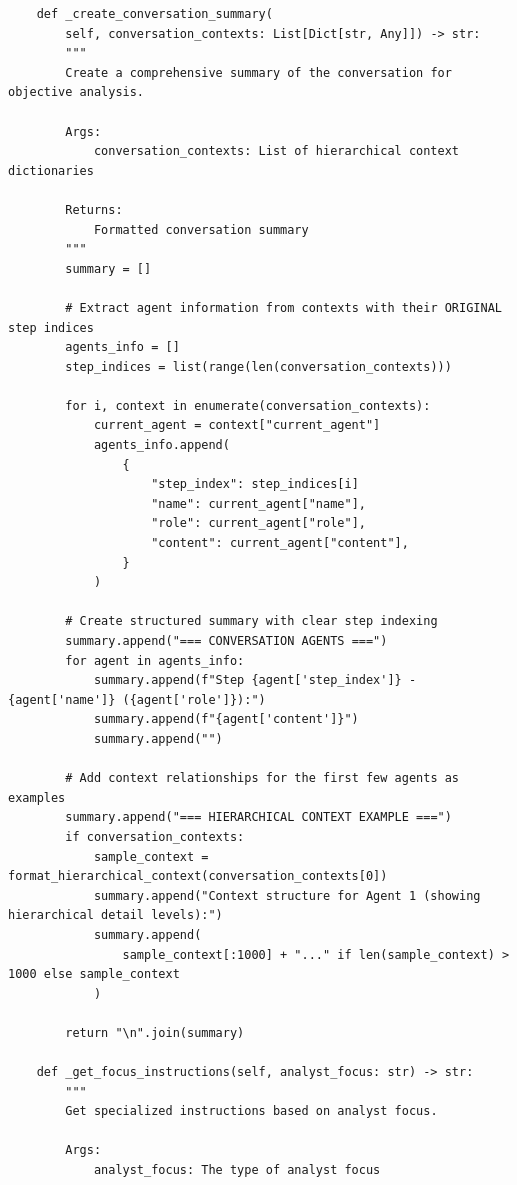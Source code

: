 \documentclass{article}
\begin{document}
\begin{lstlisting}
    def _create_conversation_summary(
        self, conversation_contexts: List[Dict[str, Any]]) -> str:
        """
        Create a comprehensive summary of the conversation for objective analysis.

        Args:
            conversation_contexts: List of hierarchical context dictionaries

        Returns:
            Formatted conversation summary
        """
        summary = []

        # Extract agent information from contexts with their ORIGINAL step indices
        agents_info = []
        step_indices = list(range(len(conversation_contexts)))

        for i, context in enumerate(conversation_contexts):
            current_agent = context["current_agent"]
            agents_info.append(
                {
                    "step_index": step_indices[i]
                    "name": current_agent["name"],
                    "role": current_agent["role"],
                    "content": current_agent["content"],
                }
            )

        # Create structured summary with clear step indexing
        summary.append("=== CONVERSATION AGENTS ===")
        for agent in agents_info:
            summary.append(f"Step {agent['step_index']} - {agent['name']} ({agent['role']}):")
            summary.append(f"{agent['content']}")
            summary.append("")

        # Add context relationships for the first few agents as examples
        summary.append("=== HIERARCHICAL CONTEXT EXAMPLE ===")
        if conversation_contexts:
            sample_context = format_hierarchical_context(conversation_contexts[0])
            summary.append("Context structure for Agent 1 (showing hierarchical detail levels):")
            summary.append(
                sample_context[:1000] + "..." if len(sample_context) > 1000 else sample_context
            )

        return "\n".join(summary)

    def _get_focus_instructions(self, analyst_focus: str) -> str:
        """
        Get specialized instructions based on analyst focus.

        Args:
            analyst_focus: The type of analyst focus


\end{lstlisting}
\end{document}
